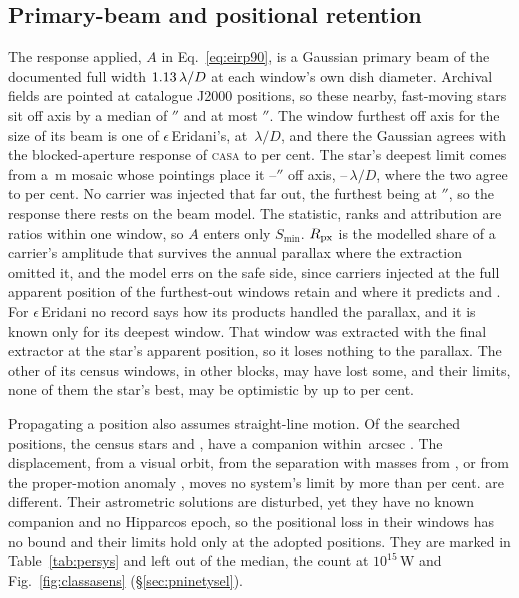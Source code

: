 \subsection{Primary-beam and positional retention}
\label{app:pbresp}

The response applied, $A$ in Eq.~\ref{eq:eirp90}, is a Gaussian primary beam
of the documented full width $1.13\,\lambda/D$ \citep{ALMAHandbook}
at each window's own dish diameter. Archival fields are pointed at catalogue
J2000 positions, so these nearby, fast-moving stars sit off axis by a median
of \PbOffMed$''$ and at most \BmOffMax$''$. The window furthest off axis for the size of its beam is one
of $\epsilon$\,Eridani's, at \BmCensusWorstC\,$\lambda/D$, and there the
Gaussian agrees with the blocked-aperture response of \textsc{casa}
\citep{CASA2022} to \BmCensusWorstPct{} per cent. The star's deepest limit
comes from a \EdDeepDish\,m mosaic whose pointings place it
\EdDeepOffLo--\EdDeepOffHi$''$ off axis, \EdDeepCLo--\EdDeepCHi\,$\lambda/D$,
where the two agree to \EdDeepAgreePct{} per cent. No carrier was injected
that far out, the furthest being at \PbInjOffMax$''$, so the response there
rests on the beam model. The statistic, ranks and
attribution are ratios within one window, so $A$ enters only $S_{\min}$.
$R_{\rm px}$ is the modelled share of a carrier's amplitude that survives the
annual parallax where the extraction omitted it, and the model errs on the
safe side, since carriers injected at the full apparent position of the
\SensNReextWin{} furthest-out windows retain \SensPxSmallMeas{} and
\SensPxLargeMeas{} where it predicts \SensPxSmallPred{} and
\SensPxLargePred. For $\epsilon$\,Eridani no record says how its
products handled the parallax, and it is known only for its deepest window.
That window was extracted with the final extractor at the star's apparent
position, so it loses nothing to the parallax. The other \EdPxNOmitWin{} of
its \BmEpsNCensus{} census windows, in \EdPxNOmitEb{} other blocks, may have
lost some, and their limits, none of them the star's best, may be
optimistic by up to \EdPxOmitBoundPct{} per cent.

Propagating a position also assumes straight-line motion. Of the
\OmNStar{} searched positions, the \OmNCensusStar{} census stars and
\CtUncatStar, \OmNComponent{} have a companion within
\OmRadius\,arcsec \citep{wds,orb6}. The displacement, from a visual orbit,
from the separation with masses from \citet{pecaut2013}, or from the
proper-motion anomaly \citep{kervella2022}, moves no system's limit by more
than \OmSysMovedMaxPct{} per cent. \OmFlagStars{} are different. Their
astrometric solutions are disturbed, yet they have no known companion and no
Hipparcos epoch, so the positional loss in their \OmNWinFlag{} windows has no
bound and their limits hold only at the adopted positions. They are marked
in Table~\ref{tab:persys} and left out of the median, the count at
$10^{15}$\,W and Fig.~\ref{fig:classasens} (\S\ref{sec:pninetysel}).


